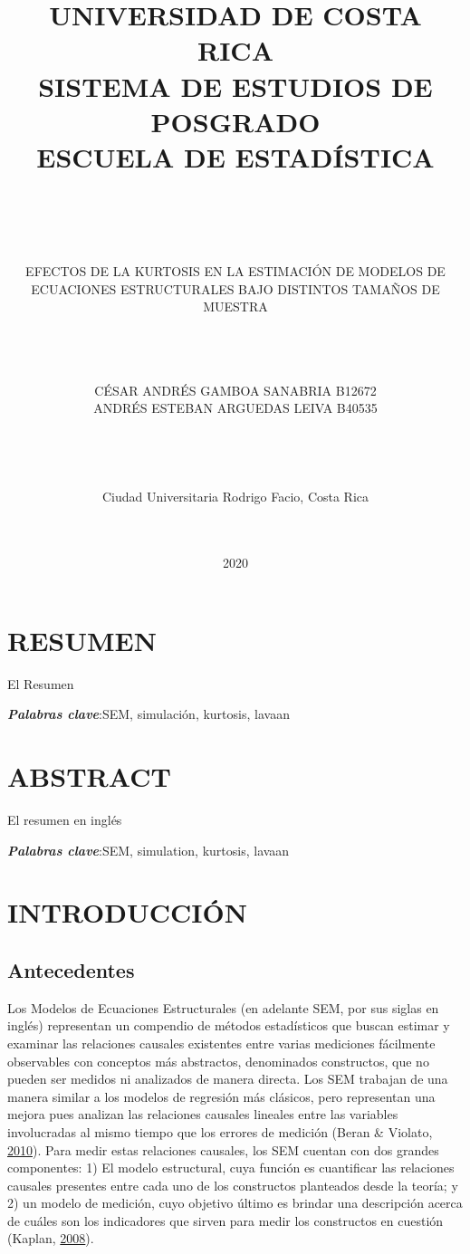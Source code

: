 \documentclass[
]{article}
\title{UNIVERSIDAD DE COSTA RICA\\
SISTEMA DE ESTUDIOS DE POSGRADO\\
ESCUELA DE ESTADÍSTICA\\
~\\
~\\}
\subtitle{EFECTOS DE LA KURTOSIS EN LA ESTIMACIÓN DE MODELOS DE
ECUACIONES ESTRUCTURALES BAJO DISTINTOS TAMAÑOS DE MUESTRA\\
~\\
~\\
~\\}
\author{\hfill\break
\hfill\break
\hfill\break
\hfill\break
\hfill\break
CÉSAR ANDRÉS GAMBOA SANABRIA B12672\\
ANDRÉS ESTEBAN ARGUEDAS LEIVA B40535\\
~\\
~\\
~\\
~\\
Ciudad Universitaria Rodrigo Facio, Costa Rica\\
~\\
~\\}
\date{2020}
\begin{document}
\maketitle

\cleardoublepage

\newpage

\section*{RESUMEN}

El Resumen

\textbf{\emph{Palabras clave}}:SEM, simulación, kurtosis, lavaan
\cleardoublepage

\section*{ABSTRACT}

El resumen en inglés

\textbf{\emph{Palabras clave}}:SEM, simulation, kurtosis, lavaan
\cleardoublepage

\newpage

\tableofcontents
\cleardoublepage
{}

\newpage

\section{INTRODUCCIÓN}

\subsection{Antecedentes}

Los Modelos de Ecuaciones Estructurales (en adelante SEM, por sus siglas
en inglés) representan un compendio de métodos estadísticos que buscan
estimar y examinar las relaciones causales existentes entre varias
mediciones fácilmente observables con conceptos más abstractos,
denominados constructos, que no pueden ser medidos ni analizados de
manera directa. Los SEM trabajan de una manera similar a los modelos de
regresión más clásicos, pero representan una mejora pues analizan las
relaciones causales lineales entre las variables involucradas al mismo
tiempo que los errores de medición (Beran \& Violato,
\protect\hyperlink{ref-Beran2010StructuralEM}{2010}). Para medir estas
relaciones causales, los SEM cuentan con dos grandes componentes: 1) El
modelo estructural, cuya función es cuantificar las relaciones causales
presentes entre cada uno de los constructos planteados desde la teoría;
y 2) un modelo de medición, cuyo objetivo último es brindar una
descripción acerca de cuáles son los indicadores que sirven para medir
los constructos en cuestión (Kaplan,
\protect\hyperlink{ref-kaplan}{2008}).
\end{document}
